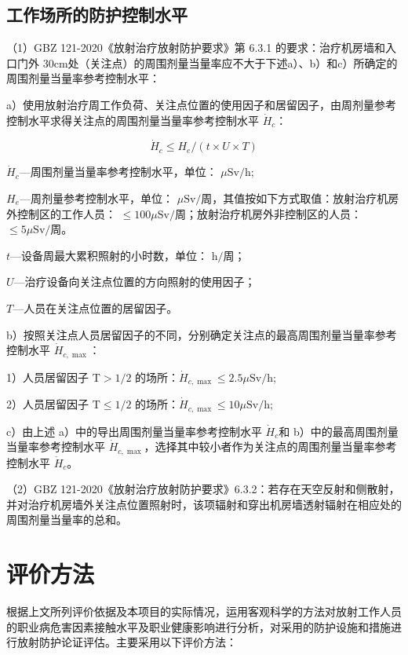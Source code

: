 \subsection{工作场所的防护控制水平}


（1）GBZ 121-2020《放射治疗放射防护要求》第 6.3.1 的要求：治疗机房墙和入口门外 $3 0 \mathrm { c m }$处（关注点）的周围剂量当量率应不大于下述a）、b）和c）所确定的周围剂量当量率参考控制水平：

a）使用放射治疗周工作负荷、关注点位置的使用因子和居留因子，由周剂量参考控制水平求得关注点的周围剂量当量率参考控制水平 $\dot { H } _ { c }$：

\begin{equation}
    \dot{H}_c\leq H_e /(t\times U\times T)
\end{equation}


$\dot { H } _ { c }$—周围剂量当量率参考控制水平，单位： $\mu \mathrm { S v / h }$;

$H _ { e }$—周剂量参考控制水平，单位： $\mu \mathrm { S v } / $周，其值按如下方式取值：放射治疗机房外控制区的工作人员： $\leq 1 0 0 \mu \mathrm { S v } /\text{周}$；放射治疗机房外非控制区的人员： ${ \le } 5 \mu \mathrm { S } \mathrm { v }/\text{周}$。

$t$—设备周最大累积照射的小时数，单位： $\mathrm { h }/\text{周}$；

$U$—治疗设备向关注点位置的方向照射的使用因子；

$T$—人员在关注点位置的居留因子。

b）按照关注点人员居留因子的不同，分别确定关注点的最高周围剂量当量率参考控制水平 $\dot{H}_{c,\max}$：

1）人员居留因子 $\mathrm{T}>1/2$ 的场所：$\dot{H}_{c,\max}\le2.5\mu\mathrm{Sv/h}$;

2）人员居留因子 $\mathrm{T}\le1/2$ 的场所：$\dot{H}_{c,\max}\le10\mu\mathrm{Sv/h}$;

c）由上述 a）中的导出周围剂量当量率参考控制水平 $\dot { H } _ { c }$和 b）中的最高周围剂量当量率参考控制水平 $\dot{H}_{c,\max}$，选择其中较小者作为关注点的周围剂量当量率参考控制水平 $\dot { H } _ { c }$。

（2）GBZ 121-2020《放射治疗放射防护要求》6.3.2：若存在天空反射和侧散射，并对治疗机房墙外关注点位置照射时，该项辐射和穿出机房墙透射辐射在相应处的周围剂量当量率的总和。


\section{评价方法}
根据上文所列评价依据及本项目的实际情况，运用客观科学的方法对放射工作人员的职业病危害因素接触水平及职业健康影响进行分析，对采用的防护设施和措施进行放射防护论证评估。主要采用以下评价方法：

